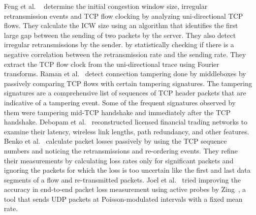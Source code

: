 Feng et al. ~\cite{tcprevisited-imc09} determine the initial congestion window size, irregular retransmission events and TCP flow clocking by analyzing uni-directional TCP flows. They calculate the ICW size using an algorithm that identifies the first large gap between the sending of two packets by the server. They also detect irregular retransmissions by the sender. by statistically checking if there is a negative correlation between the retransmission rate and the sending rate. They extract the TCP flow clock from the uni-directional trace using Fourier transforms.  Raman et al.~\cite{tampering-sigcomm23} detect connection tampering done by middleboxes by passively comparing TCP flows with certain tampering signatures. The tampering signatures are a comprehensive list of sequences of TCP header packets that are indicative of a tampering event. Some of the frequent signatures observed by them were tampering mid-TCP handshake and immediately after the TCP handshake. Debopam et al.~\cite{latency-imc20} reconstructed licensed financial trading networks to examine their latency, wireless link lengths, path redundancy, and other features. Benko et al.~\cite{1189102} calculate packet losses passively by using the TCP sequence numbers and noticing the retransmissions and re-ordering events. They refine their measurements by calculating loss rates only for significant packets and ignoring the packets for which the loss is too uncertain like the first and last data segments of a flow and re-transmitted packets. Joel et al.~\cite{10.1145/1090191.1080111}
tried improving the accuracy in end-to-end packet loss measurement using active probes by Zing~\cite{707817}, a tool that sends UDP packets at Poisson-modulated intervals with a fixed mean rate.
